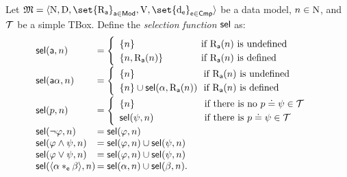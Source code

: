 
\begin{definition}
    \label{def:selection:tbox}
    Let $\model = \tup{ \N, \D, \set{\R_{\apath}}_{\apath \in \mods}, \valuation,\set{\data_\cmp}_{\cmp \in \cmps} }$ be a data model, $n\in\mathrm{N}$, and $\mathcal{T}$ be a simple TBox.
    Define the \emph{selection function} $\operatorname{\mathsf{sel}}$ as:
    \[
    \begin{array}{@{\ }l@{\,}l@{}@{\ }l}
        \sel(\apath,n) & = \begin{cases}
            \begin{array}{l@{\quad\quad\quad~~}l}
                \{n\}  & \text{\ if $\R_{\apath}(n)$ is undefined}\\
                \{n,\R_\apath(n)\} & \text{\ if $\R_{\apath}(n)$ is defined} \\
            \end{array}
            \end{cases} 
            \\[10pt] 
        \sel(\apath\alpha,n) & = \begin{cases}
            \begin{array}{l@{~}@{~}l}
                \{n\} & \text{if $\R_{\apath}(n)$ is undefined} \\
                \{n\} \cup \sel(\alpha,\R_\apath(n)) & \text{if $\R_{\apath}(n)$ is defined}
            \end{array}
            \end{cases}                     
            \\[10pt] 
        \sel(p,n) & = \begin{cases}
        \begin{array}{l@{\quad\quad\quad\quad\quad~}l}
            \{n\} & \text{if there is no ${p \doteq \psi} \in \tbox$} \\
            \sel(\psi, n) & \text{if there is ${p \doteq \psi} \in \tbox$} 
        \end{array}
        \end{cases}
        \\[10pt] 
        \sel(\neg\varphi,n) & = \sel(\varphi,n) \\
        \sel(\varphi\land\psi,n) & = \sel(\varphi,n) \cup \sel(\psi,n) \\
        \sel(\varphi\lor\psi,n) & = \sel(\varphi,n) \cup \sel(\psi,n) \\
        \sel(\tup{\alpha *_{\cmp}\beta},n) & = \sel(\alpha,n) \cup \sel(\beta,n).
    \end{array}
\]
\end{definition}
